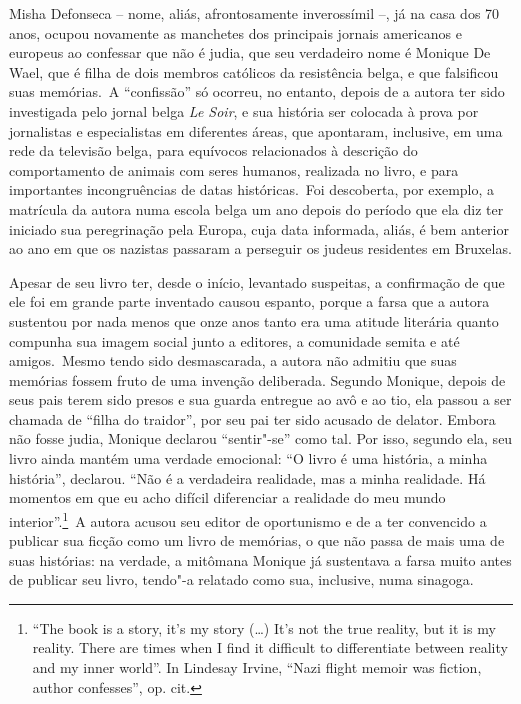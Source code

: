 Misha Defonseca -- nome, aliás, afrontosamente inverossímil --, já na
casa dos 70 anos, ocupou novamente as manchetes dos principais jornais
americanos e europeus ao confessar que não é judia, que seu verdadeiro
nome é Monique De Wael, que é filha de dois membros católicos da
resistência belga, e que falsificou suas memórias.~A ``confissão'' só
ocorreu, no entanto, depois de a autora ter sido investigada pelo jornal
belga \emph{Le Soir}, e sua história ser colocada à prova por
jornalistas e especialistas em diferentes áreas, que apontaram,
inclusive, em uma rede da televisão belga, para equívocos relacionados à
descrição do comportamento de animais com seres humanos, realizada no
livro, e para importantes incongruências de datas históricas.~Foi
descoberta, por exemplo, a matrícula da autora numa escola belga um ano
depois do período que ela diz ter iniciado sua peregrinação pela Europa,
cuja data informada, aliás, é bem anterior ao ano em que os nazistas
passaram a perseguir os judeus residentes em Bruxelas.

Apesar de seu livro ter, desde o início, levantado suspeitas, a
confirmação de que ele foi em grande parte inventado causou espanto,
porque a farsa que a autora sustentou por nada menos que onze anos tanto
era uma atitude literária quanto compunha sua imagem social junto a
editores, a comunidade semita e até amigos.~Mesmo tendo sido
desmascarada, a autora não admitiu que suas memórias fossem fruto de uma
invenção deliberada. Segundo Monique, depois de seus pais terem sido
presos e sua guarda entregue ao avô e ao tio, ela passou a ser chamada
de ``filha do traidor'', por seu pai ter sido acusado de delator. Embora
não fosse judia, Monique declarou ``sentir"-se'' como tal. Por isso,
segundo ela, seu livro ainda mantém uma verdade emocional: ``O livro é
uma história, a minha história'', declarou. ``Não é a verdadeira
realidade, mas a minha realidade. Há momentos em que eu acho difícil
diferenciar a realidade do meu mundo interior''.\footnote{``The book is
  a story, it's my story (\ldots{}) It's not the true reality, but it is my
  reality. There are times when I find it difficult to differentiate
  between reality and my inner world''. In Lindesay Irvine, ``Nazi
  flight memoir was fiction, author confesses'', op. cit.}~A autora
acusou seu editor de oportunismo e de a ter convencido a publicar sua
ficção como um livro de memórias, o que não passa de mais uma de suas
histórias: na verdade, a mitômana Monique já sustentava a farsa muito
antes de publicar seu livro, tendo"-a relatado como sua, inclusive, numa
sinagoga.


